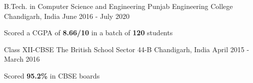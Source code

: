 


\begin{cventries}


\cventry
{B.Tech. in Computer Science and Engineering} %
{Punjab Engineering College} %
{Chandigarh, India} %
{June 2016 - July 2020} %
{ %
\begin{cvitems}
\item {Scored a CGPA of \textbf{8.66/10} in a batch of \textbf{120} students}
\end{cvitems}
}


\cventry
{Class XII-CBSE} %
{The British School} %
{Sector 44-B Chandigarh, India} %
{April 2015 - March 2016} %
{ %
\begin{cvitems}
\item {Scored \textbf{95.2\%} in CBSE boards}
\end{cvitems}
}




\end{cventries}